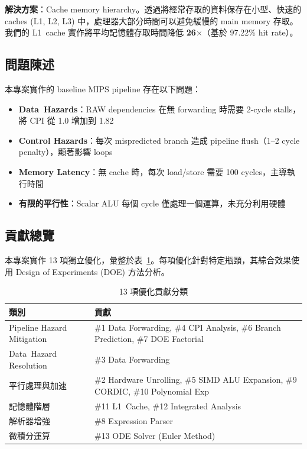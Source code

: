 \documentclass[journal]{IEEEtran}
\begin{document}
\textbf{解決方案}：Cache memory hierarchy。透過將經常存取的資料保存在小型、快速的 caches (L1, L2, L3) 中，處理器大部分時間可以避免緩慢的 main memory 存取。我們的 L1~cache 實作將平均記憶體存取時間降低 \textbf{26$\times$}（基於 97.22\% hit rate）。

\subsection{問題陳述}
本專案實作的 baseline MIPS pipeline 存在以下問題：
\begin{itemize}
    \item \textbf{Data~Hazards}：RAW dependencies 在無 forwarding 時需要 2-cycle stalls，將 CPI 從 1.0 增加到 1.82
    \item \textbf{Control Hazards}：每次 mispredicted branch 造成 pipeline flush（1--2 cycle penalty），顯著影響 loops
    \item \textbf{Memory Latency}：無 cache 時，每次 load/store 需要 100 cycles，主導執行時間
    \item \textbf{有限的平行性}：Scalar ALU 每個 cycle 僅處理一個運算，未充分利用硬體
\end{itemize}

\subsection{貢獻總覽}
本專案實作 13 項獨立優化，彙整於表~\ref{tab:contributions}。每項優化針對特定瓶頸，其綜合效果使用 Design of Experiments (DOE) 方法分析。

\begin{table}[!t]
\centering
\caption{13 項優化貢獻分類}
\label{tab:contributions}
\footnotesize
\begin{tabular}{@{}p{2.0cm}p{6.0cm}@{}}
\toprule
\textbf{類別} & \textbf{貢獻} \\
\midrule
Pipeline Hazard Mitigation & \#1 Data Forwarding, \#4 CPI Analysis, \#6 Branch Prediction, \#7 DOE Factorial \\
\midrule
Data~Hazard Resolution & \#3 Data Forwarding \\
\midrule
平行處理與加速 & \#2 Hardware Unrolling, \#5 SIMD ALU Expansion, \#9 CORDIC, \#10 Polynomial Exp \\
\midrule
記憶體階層 & \#11 L1~Cache, \#12 Integrated Analysis \\
\midrule
解析器增強 & \#8 Expression Parser \\
\midrule
微積分運算 & \#13 ODE Solver (Euler Method) \\
\bottomrule
\end{tabular}
\end{table}
\end{document}
